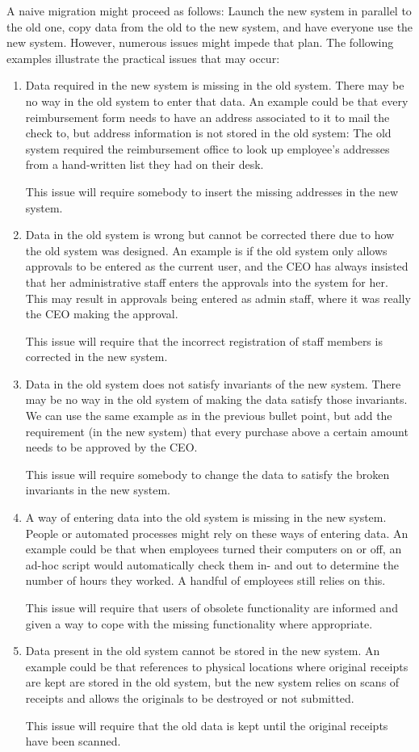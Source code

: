 \documentclass{elsarticle}
\begin{document}
   A naive migration might proceed as follows:
   Launch the new system in parallel to the old one, copy data from the old to the new system, and have everyone use the new system.
   However, numerous issues might impede that plan.
   The following examples illustrate the practical issues that may occur:
\begin{enumerate}
\item Data required in the new system is missing in the old system.
   There may be no way in the old system to enter that data.
   An example could be that every reimbursement form needs to have an address associated to it to mail the check to, but address information is not stored in the old system:
   The old system required the reimbursement office to look up employee's addresses from a hand-written list they had on their desk.

   This issue will require somebody to insert the missing addresses in the new system.
\item Data in the old system is wrong but cannot be corrected there due to how the old system was designed.
   An example is if the old system only allows approvals to be entered as the current user, and the CEO has always insisted that her administrative staff enters the approvals into the system for her.
   This may result in approvals being entered as admin staff, where it was really the CEO making the approval.

   This issue will require that the incorrect registration of staff members is corrected in the new system.
\item Data in the old system does not satisfy invariants of the new system.
   There may be no way in the old system of making the data satisfy those invariants.
   We can use the same example as in the previous bullet point,
   but add the requirement (in the new system) that every purchase above a certain amount needs to be approved by the CEO.

   This issue will require somebody to change the data to satisfy the broken invariants in the new system.
\item A way of entering data into the old system is missing in the new system.
   People or automated processes might rely on these ways of entering data.
   An example could be that when employees turned their computers on or off,
   an ad-hoc script would automatically check them in- and out to determine the number of hours they worked.
   A handful of employees still relies on this.

   This issue will require that users of obsolete functionality are informed and given a way to cope with the missing functionality where appropriate.
\item Data present in the old system cannot be stored in the new system.
   An example could be that references to physical locations where original receipts are kept are stored in the old system,
   but the new system relies on scans of receipts and allows the originals to be destroyed or not submitted.

   This issue will require that the old data is kept until the original receipts have been scanned.
\end{enumerate}
\end{document}
